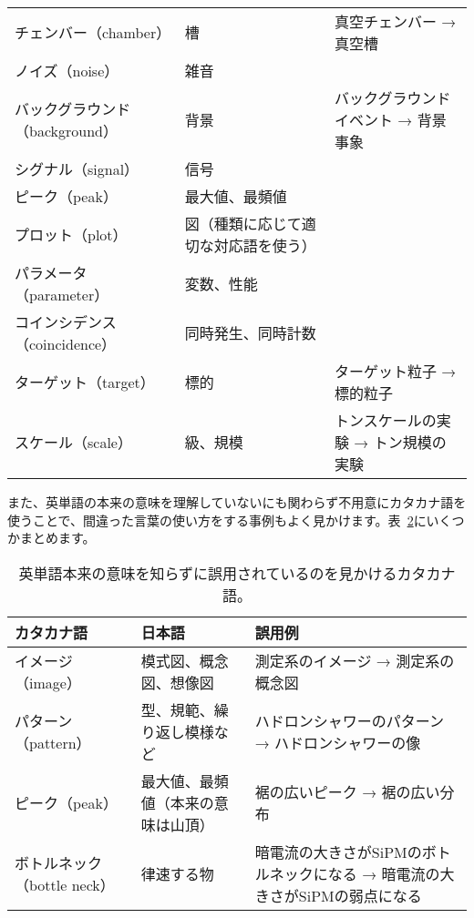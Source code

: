 \begin{table}
\begin{tabular}{lll}
    チェンバー（chamber） & 槽 & 真空チェンバー → 真空槽 \\
    ノイズ（noise） & 雑音 &  \\
    バックグラウンド（background） & 背景 & バックグラウンドイベント → 背景事象 \\
    シグナル（signal） & 信号 &  \\
    ピーク（peak） & 最大値、最頻値 &  \\
    プロット（plot） & 図（種類に応じて適切な対応語を使う） &  \\
    パラメータ（parameter） & 変数、性能 &  \\
    コインシデンス（coincidence） & 同時発生、同時計数 &  \\
    ターゲット（target） & 標的 & ターゲット粒子 → 標的粒子 \\
    スケール（scale） & 級、規模 & トンスケールの実験 → トン規模の実験 \\
    \hline
  \end{tabular}
  \label{katakana}
\end{table}

また、英単語の本来の意味を理解していないにも関わらず不用意にカタカナ語を使うことで、間違った言葉の使い方をする事例もよく見かけます。表~\ref{wrong_katakana}にいくつかまとめます。

\begin{table}
  \centering
  \caption{英単語本来の意味を知らずに誤用されているのを見かけるカタカナ語。}
  \begin{tabular}{lll}
    \hline
    カタカナ語 & 日本語 & 誤用例 \\
    \hline
    イメージ（image） & 模式図、概念図、想像図 & 測定系のイメージ → 測定系の概念図 \\
    パターン（pattern） & 型、規範、繰り返し模様など & ハドロンシャワーのパターン → ハドロンシャワーの像 \\
    ピーク（peak） & 最大値、最頻値（本来の意味は山頂） & 裾の広いピーク → 裾の広い分布 \\
    ボトルネック（bottle neck） & 律速する物 & 暗電流の大きさがSiPMのボトルネックになる → 暗電流の大きさがSiPMの弱点になる \\
    \hline
  \end{tabular}
  \label{wrong_katakana}
\end{table}

